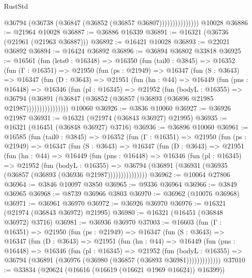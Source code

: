 \begin{lexlean}{RustStd}
\begin{coremodule}
                        @36794 (@36738 (@36847 (@36852 (@36857 @36807)))))))))))))))
    @10028
@36886 := @21964 @10028
@36887 := @36886 @16339
@36891 := @16321 (@36736 (@21961 (@21963 @36887)))
@36892 := @16421 @10028
@36893 := @22021 @36892
@36894 := @16424 @36892
@36896 := @36894 @36802 @33818
@36925 := @16561
    (fun (lets0 : @16348) =>
    @16350
      (fun (tail0 : @3845) =>
      @16352
        (fun (Γ : @16351) =>
        @21950
          (fun (ps : @21949) =>
          @16347
            (fun (S : @3643) =>
            @16347
              (fun (D : @3643) =>
              @21951
                (fun (hn : @44) =>
                @16449
                  (fun (pns : @16448) =>
                  @16346
                    (fun (pl : @16345) =>
                    @21952
                      (fun (bodyL : @16355) =>
                      @36794
                        (@36891
                          (@36847 (@36852 (@36857 (@36893 (@36896 @21985 @21987))))))))))))))))
    @10060
@36926 := @3836 @10060
@36927 := @36926 @21987
@36931 := @16321 (@21974 (@36843 @36927) @21995)
@36935 := @16321 (@16451 (@36848 @36927) @3716)
@36936 := @36896 @10060
@36961 := @16585
    (fun (tail0 : @3845) =>
    @16352
      (fun (Γ : @16351) =>
      @21950
        (fun (ps : @21949) =>
        @16347
          (fun (S : @3643) =>
          @16347
            (fun (D : @3643) =>
            @21951
              (fun (hn : @44) =>
              @16449
                (fun (pns : @16448) =>
                @16346
                  (fun (pl : @16345) =>
                  @21952
                    (fun (bodyL : @16355) =>
                    @36794 (@36891 (@36931 (@36935 (@36857 (@36893 (@36936 @21987)))))))))))))))
@36962 := @10064 @27806
@36964 := @3846 @10097 @3850
@36965 := @9336 @36964
@36966 := @3849 @36965
@36968 := @8739 @36966 @3803
@36970 := @36962 (@10076 @36968)
@36971 := @36961 @36970
@36972 := @36926 @36970
@36976 := @16321 (@21974 (@36843 @36972) @21995)
@36980 := @16321 (@16451 (@36848 @36972) @3716)
@36981 := @36936 @36970
@37003 := @16603
    (fun (Γ : @16351) =>
    @21950
      (fun (ps : @21949) =>
      @16347
        (fun (S : @3643) =>
        @16347
          (fun (D : @3643) =>
          @21951
            (fun (hn : @44) =>
            @16449
              (fun (pns : @16448) =>
              @16346
                (fun (pl : @16345) =>
                @21952
                  (fun (bodyL : @16355) =>
                  @36794 (@36891 (@36976 (@36980 (@36857 (@36893 @36981)))))))))))))
@37010 := @33834 (@20624 (@16616 (@16619 (@16621 @1969 @16624)) @16399))

\end{coremodule}
\end{lexlean}
